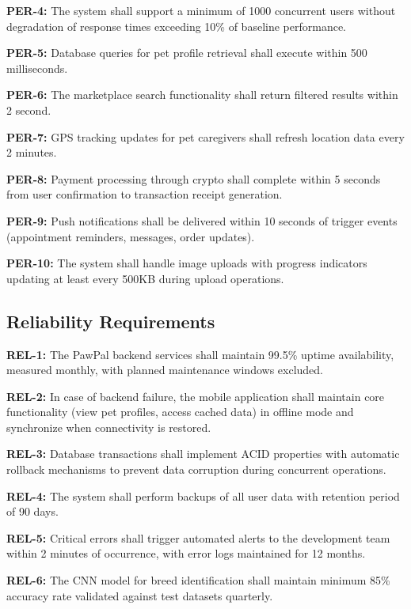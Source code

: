 \textbf{PER-4:} The system shall support a minimum of 1000 concurrent users without degradation of response times exceeding 10\% of baseline performance.

\textbf{PER-5:} Database queries for pet profile retrieval shall execute within 500 milliseconds.

\textbf{PER-6:} The marketplace search functionality shall return filtered results within 2 second.

\textbf{PER-7:}  GPS tracking updates for pet caregivers shall refresh location data every 2 minutes.

\textbf{PER-8:} Payment processing through crypto shall complete within 5 seconds from user confirmation to transaction receipt generation.

\textbf{PER-9:} Push notifications shall be delivered within 10 seconds of trigger events (appointment reminders, messages, order updates).

\textbf{PER-10:} The system shall handle image uploads with progress indicators updating at least every 500KB during upload operations.

\subsection{Reliability Requirements}

\textbf{REL-1:} The PawPal backend services shall maintain 99.5\% uptime availability, measured monthly, with planned maintenance windows excluded.


\textbf{REL-2:} In case of backend failure, the mobile application shall maintain core functionality (view pet profiles, access cached data) in offline mode and synchronize when connectivity is restored.



\textbf{REL-3:} Database transactions shall implement ACID properties with automatic rollback mechanisms to prevent data corruption during concurrent operations.

\textbf{REL-4:} The system shall perform backups of all user data with retention period of 90 days.

\textbf{REL-5:} Critical errors shall trigger automated alerts to the development team within 2 minutes of occurrence, with error logs maintained for 12 months.

\textbf{REL-6:} The CNN model for breed identification shall maintain minimum 85\% accuracy rate validated against test datasets quarterly.

